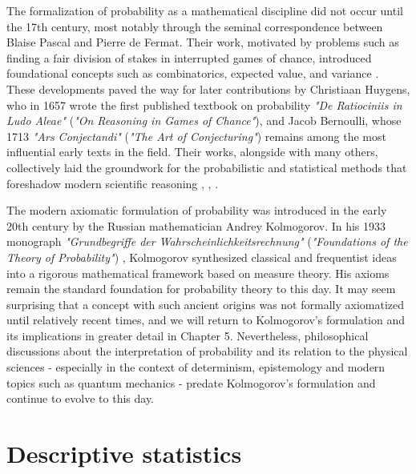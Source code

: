 \documentclass{book}
\begin{document}
\medskip

The formalization of probability as a mathematical discipline did not occur until the 17th century, most notably through the seminal correspondence between Blaise Pascal and Pierre de Fermat. Their work, motivated by problems such as finding a fair division of stakes in interrupted games of chance, introduced foundational concepts such as combinatorics, expected value, and variance \cite{devlin2008unfinished}. These developments paved the way for later contributions by Christiaan Huygens, who in 1657 wrote the first published textbook on probability \textit{"De Ratiociniis in Ludo Aleae"} (\textit{"On Reasoning in Games of Chance"}), and Jacob Bernoulli, whose 1713 \textit{"Ars Conjectandi"} (\textit{"The Art of Conjecturing"}) remains among the most influential early texts in the field. Their works, alongside with many others, collectively laid the groundwork for the probabilistic and statistical methods that foreshadow modern scientific reasoning \cite{huygens1657ratiociniis}, \cite{bernoulli1713ars}, \cite{hald1990history}.

\medskip

The modern axiomatic formulation of probability was introduced in the early 20th century by the Russian mathematician Andrey Kolmogorov. In his 1933 monograph \textit{"Grundbegriffe der Wahrscheinlichkeitsrechnung"} (\textit{"Foundations of the Theory of Probability"}) \cite{kolmogorov1933grundbegriffe}, Kolmogorov synthesized classical and frequentist ideas into a rigorous mathematical framework based on measure theory. His axioms remain the standard foundation for probability theory to this day. It may seem surprising that a concept with such ancient origins was not formally axiomatized until relatively recent times, and we will return to Kolmogorov’s formulation and its implications in greater detail in Chapter 5. Nevertheless, philosophical discussions about the interpretation of probability and its relation to the physical sciences - especially in the context of determinism, epistemology and modern topics such as quantum mechanics - predate Kolmogorov's formulation and continue to evolve to this day.



\chapter{Descriptive statistics}
\end{document}
